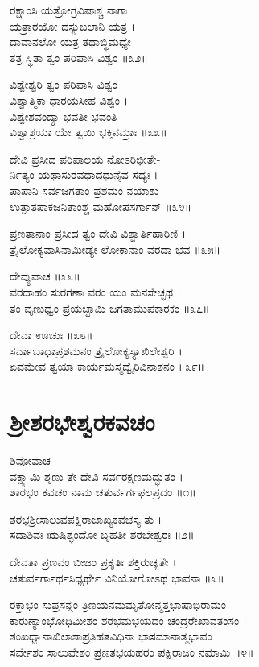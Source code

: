 ರಕ್ಷಾಂಸಿ ಯತ್ರೋಗ್ರವಿಷಾಶ್ಚ ನಾಗಾ\\
        ಯತ್ರಾರಯೋ ದಸ್ಯುಬಲಾನಿ ಯತ್ರ ।\\
ದಾವಾನಲೋ ಯತ್ರ ತಥಾಬ್ಧಿಮಧ್ಯೇ\\
        ತತ್ರ ಸ್ಥಿತಾ ತ್ವಂ ಪರಿಪಾಸಿ ವಿಶ್ವಂ ॥೩೨॥

ವಿಶ್ವೇಶ್ವರಿ ತ್ವಂ ಪರಿಪಾಸಿ ವಿಶ್ವಂ\\
        ವಿಶ್ವಾತ್ಮಿಕಾ ಧಾರಯಸೀಹ ವಿಶ್ವಂ ।\\
ವಿಶ್ವೇಶವಂದ್ಯಾ ಭವತೀ ಭವಂತಿ\\
        ವಿಶ್ವಾಶ್ರಯಾ ಯೇ ತ್ವಯಿ ಭಕ್ತಿನಮ್ರಾಃ ॥೩೩॥

ದೇವಿ ಪ್ರಸೀದ ಪರಿಪಾಲಯ ನೋಽರಿಭೀತೇ-\\
      ರ್ನಿತ್ಯಂ ಯಥಾಸುರವಧಾದಧುನೈವ ಸದ್ಯಃ ।\\
ಪಾಪಾನಿ ಸರ್ವಜಗತಾಂ ಪ್ರಶಮಂ ನಯಾಶು\\
        ಉತ್ಪಾತಪಾಕಜನಿತಾಂಶ್ಚ ಮಹೋಪಸರ್ಗಾನ್ ॥೩೪॥

ಪ್ರಣತಾನಾಂ ಪ್ರಸೀದ ತ್ವಂ ದೇವಿ ವಿಶ್ವಾರ್ತಿಹಾರಿಣಿ ।\\
ತ್ರೈಲೋಕ್ಯವಾಸಿನಾಮೀಡ್ಯೇ ಲೋಕಾನಾಂ ವರದಾ ಭವ ॥೩೫॥

ದೇವ್ಯುವಾಚ ॥೩೬॥\\
ವರದಾಹಂ ಸುರಗಣಾ ವರಂ ಯಂ ಮನಸೇಚ್ಛಥ ।\\
ತಂ ವೃಣುಧ್ವಂ ಪ್ರಯಚ್ಛಾಮಿ ಜಗತಾಮುಪಕಾರಕಂ ॥೩೭॥

ದೇವಾ ಊಚುಃ ॥೩೮॥\\
ಸರ್ವಾಬಾಧಾಪ್ರಶಮನಂ ತ್ರೈಲೋಕ್ಯಸ್ಯಾಖಿಲೇಶ್ವರಿ ।\\
ಏವಮೇವ ತ್ವಯಾ ಕಾರ್ಯಮಸ್ಮದ್ವೈರಿವಿನಾಶನಂ ॥೩೯॥
\section{ಶ್ರೀಶರಭೇಶ್ವರಕವಚಂ}

ಶಿವೋವಾಚ\\
ವಕ್ಷ್ಯಾಮಿ ಶೃಣು ತೇ ದೇವಿ ಸರ್ವರಕ್ಷಣಮದ್ಭುತಂ ।\\
ಶಾರಭಂ ಕವಚಂ ನಾಮ ಚತುರ್ವರ್ಗಫಲಪ್ರದಂ ॥೧॥

ಶರಭಶ್ರೀಸಾಲುವಪಕ್ಷಿರಾಜಾಖ್ಯಕವಚಸ್ಯ ತು ।\\
ಸದಾಶಿವಃ ಋಷಿಶ್ಛಂದೋ ಬೃಹತೀ ಶರಭೇಶ್ವರಃ ॥೨॥

ದೇವತಾ ಪ್ರಣವಂ ಬೀಜಂ ಪ್ರಕೃತಿಃ ಶಕ್ತಿರುಚ್ಯತೇ ।\\
ಚತುರ್ವರ್ಗಾರ್ಥಸಿಧ್ಯರ್ಥೇ ವಿನಿಯೋಗೋಽಥ ಭಾವನಾ ॥೩॥

ರಕ್ತಾಭಂ ಸುಪ್ರಸನ್ನಂ ತ್ರಿಣಯನಮಮೃತೋನ್ಮತ್ತಭಾಷಾಭಿರಾಮಂ\\
ಕಾರುಣ್ಯಾಂಭೋಧಿಮೀಶಂ ಶರಭಮಭಯದಂ ಚಂದ್ರರೇಖಾವತಂಸಂ ।\\
ಶಂಖಧ್ವಾನಾಖಿಲಾಶಾಪ್ರತಿಹತವಿಧಿನಾ ಭಾಸಮಾನಾತ್ಮಭಾವಂ\\
ಸರ್ವೇಶಂ ಸಾಲುವೇಶಂ ಪ್ರಣತಭಯಹರಂ ಪಕ್ಷಿರಾಜಂ ನಮಾಮಿ ॥೪॥


